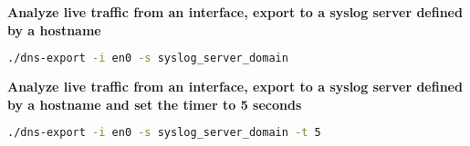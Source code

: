 \vspace{0.5cm}
\textbf{Analyze live traffic from an interface, export to a syslog server defined by a hostname}
\begin{lstlisting}[language=Bash] 
./dns-export -i en0 -s syslog_server_domain
\end{lstlisting}

\vspace{0.5cm}
\textbf{Analyze live traffic from an interface, export to a syslog server defined by a hostname and set the timer to 5 seconds}
\begin{lstlisting}[language=Bash] 
./dns-export -i en0 -s syslog_server_domain -t 5
\end{lstlisting}

